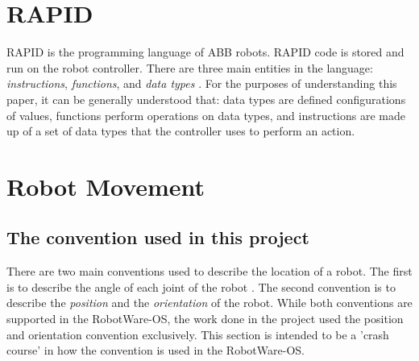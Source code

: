 \documentclass{cslthse-msc}
\begin{document}
\section{RAPID}
\label{sec:Tech_Back:Rapid}
RAPID is the programming language of ABB robots. RAPID code is stored and run on the robot controller. There are three main entities in the language: \textit{instructions}, \textit{functions}, and \textit{data types} \cite{ABB:rapid_instructions}. For the purposes of understanding this paper, it can be generally understood that: data types are defined configurations of values, functions perform operations on data types, and instructions are made up of a set of data types that the  controller uses to perform an action. 

\section{Robot Movement}
\label{sec:Tech_Back:Rob_Move}

\subsection{The convention used in this project}
\label{sec:Tech_Back:Rob_Move:conventions}
There are two main conventions used to describe the location of a robot. The first is to describe the angle of each joint of the robot . The second convention is to describe the \textit{position} and the \textit{orientation} of the robot. While both conventions are supported in the RobotWare-OS, the work done in the project used the position and orientation convention exclusively. This section is intended to be a 'crash course' in how the convention is used in the RobotWare-OS. 
\end{document}
